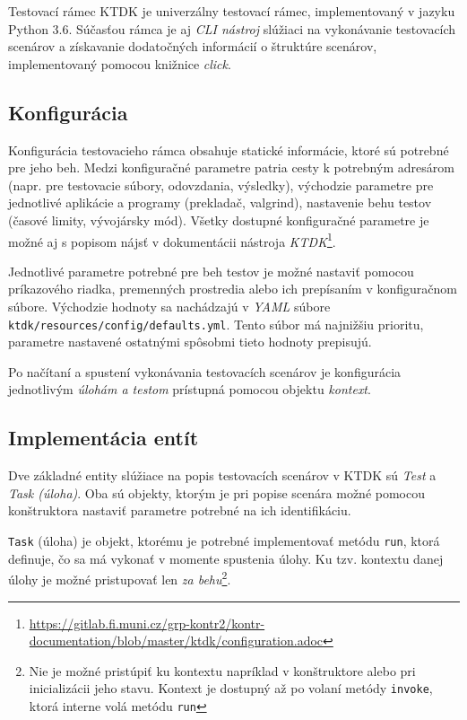 \documentclass[
  digital, %
  twoside, %
  table,   %
  lof,     %
  lot,     %
]{fithesis3}
\begin{document}
Testovací rámec KTDK je univerzálny testovací rámec, implementovaný v jazyku Python 3.6. Súčasťou rámca je aj \emph{CLI nástroj} slúžiaci na vykonávanie testovacích scenárov a získavanie dodatočných informácií o štruktúre scenárov, implementovaný pomocou knižnice \emph{click}.

\subsection{Konfigurácia}
Konfigurácia testovacieho rámca obsahuje statické informácie, ktoré sú potrebné pre jeho beh. Medzi konfiguračné parametre patria cesty k potrebným adresárom (napr. pre testovacie súbory, odovzdania, výsledky),
východzie parametre pre jednotlivé aplikácie a programy (prekladač, valgrind), nastavenie behu testov (časové limity, vývojársky mód). Všetky dostupné konfiguračné parametre je možné aj s popisom nájsť v dokumentácii nástroja \emph{KTDK}\footnote{\url{https://gitlab.fi.muni.cz/grp-kontr2/kontr-documentation/blob/master/ktdk/configuration.adoc}}.

Jednotlivé parametre potrebné pre beh testov je možné nastaviť pomocou príkazového riadka, premenných prostredia alebo ich prepísaním v konfiguračnom súbore. Východzie hodnoty sa nachádzajú v \emph{YAML} súbore \texttt{ktdk/resources/config/defaults.yml}. Tento súbor má najnižšiu prioritu, parametre nastavené ostatnými spôsobmi tieto hodnoty prepisujú.

Po načítaní a spustení vykonávania testovacích scenárov je konfigurácia jednotlivým \emph{úlohám a testom} prístupná pomocou objektu \emph{kontext}.


\subsection{Implementácia entít}

Dve základné entity slúžiace na popis testovacích scenárov v KTDK sú \emph{Test} a \emph{Task (úloha)}. Oba sú objekty, ktorým je pri popise scenára možné pomocou konštruktora nastaviť parametre potrebné na ich identifikáciu. 

\texttt{Task} (úloha) je objekt, ktorému je potrebné implementovať metódu \texttt{run}, ktorá definuje, čo sa má vykonať v momente spustenia úlohy. Ku tzv. kontextu danej úlohy je možné pristupovať len \emph{za behu}\footnote{Nie je možné pristúpiť ku kontextu napríklad v konštruktore alebo pri inicializácii jeho stavu. Kontext je dostupný až po volaní metódy \texttt{invoke}, ktorá interne volá metódu \texttt{run}}.
\end{document}
